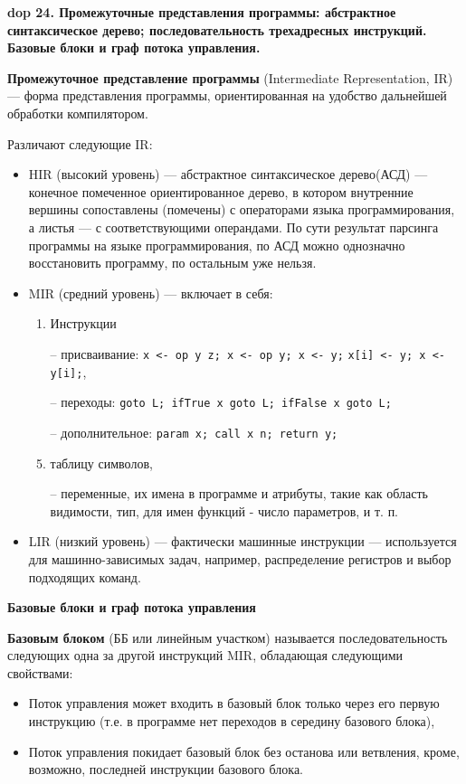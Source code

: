 \textbf{\LARGE dop 24. Промежуточные  представления  программы:  абстрактное  синтаксическое  дерево;  последовательность трехадресных инструкций. Базовые блоки и граф потока управления.}

\textbf{Промежуточное представление программы} (Intermediate Representation, IR) --- форма представления программы, ориентированная на удобство дальнейшей обработки компилятором.

Различают следующие IR:
\begin{itemize}
    \item HIR (высокий уровень) --- абстрактное синтаксическое дерево(АСД) --- конечное помеченное ориентированное дерево, в котором внутренние вершины сопоставлены (помечены) с операторами языка программирования, а листья --- с соответствующими операндами. По сути результат парсинга программы на языке программирования, по АСД можно однозначно восстановить программу, по остальным уже нельзя.
    \item MIR (средний уровень) --- включает в себя:
    \begin{enumerate}
        \item Инструкции
        \item[--] присваивание: \texttt{x <- op y z; x <- op y; x <- y;}
        \texttt{x[i] <- y; x <- y[i];},
        \item[--] переходы: \texttt{goto L; ifTrue x goto L; ifFalse x goto L;}
        \item[--] дополнительное: \texttt{param x; call x n; return y;}
        \item таблицу символов,
        \item[--] переменные, их имена в программе и атрибуты, такие как область видимости, тип, для имен функций - число параметров, и т. п.
    \end{enumerate}
    \item LIR (низкий уровень) --- фактически машинные инструкции --- используется для машинно-зависимых задач, например, распределение регистров и выбор подходящих команд.
\end{itemize}

\textbf{Базовые блоки и граф потока управления}

\textbf{Базовым блоком} (ББ или линейным участком) называется последовательность следующих одна за другой инструкций MIR, обладающая следующими свойствами:
\begin{itemize}
    \item Поток управления может входить в базовый блок только через его первую инструкцию (т.е. в программе нет переходов в середину базового блока),
    \item Поток управления покидает базовый блок без останова или ветвления, кроме, возможно, последней инструкции базового блока.
\end{itemize}

